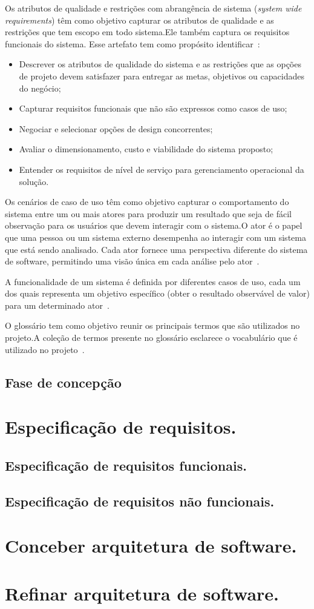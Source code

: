 Os atributos de qualidade e restrições com abrangência de sistema (\emph{system wide requirements}) têm como objetivo  capturar os atributos de qualidade e as restrições que tem escopo em todo sistema.Ele também captura os requisitos funcionais do sistema. Esse artefato tem como propósito identificar~\cite{openup}:

\begin{itemize}
    \item Descrever os atributos de qualidade do sistema e as restrições que as opções de projeto devem satisfazer para entregar as metas, objetivos ou capacidades do negócio;
    \item Capturar requisitos funcionais que não são expressos como casos de uso;
    \item Negociar e selecionar opções de design concorrentes;
    \item Avaliar o dimensionamento, custo e viabilidade do sistema proposto;
    \item Entender os requisitos de nível de serviço para gerenciamento operacional da solução.
\end{itemize}

Os cenários de caso de uso têm como objetivo capturar o comportamento do sistema entre um ou mais atores para produzir um resultado que seja de fácil observação para os usuários que devem interagir com o sistema.O ator é o papel que uma pessoa ou um sistema externo desempenha ao interagir com um sistema que está sendo analisado. Cada ator fornece uma perspectiva diferente do sistema de software, permitindo uma visão única em cada análise pelo ator~\cite{openup}.

A funcionalidade de um sistema é definida por diferentes casos de uso, cada um dos quais representa um objetivo específico (obter o resultado observável de valor) para um determinado ator~\cite{openup}.

O glossário tem como objetivo reunir os principais termos que são utilizados no projeto.A coleção de termos presente no glossário esclarece o vocabulário que é utilizado no projeto~\cite{openup}.    

    
\subsection{Fase de concepção}
\section{Especificação de requisitos.}
\subsection{Especificação de requisitos funcionais.}
\subsection{Especificação de requisitos não funcionais.}
\section{Conceber arquitetura de software.}
\section{Refinar arquitetura de software.}